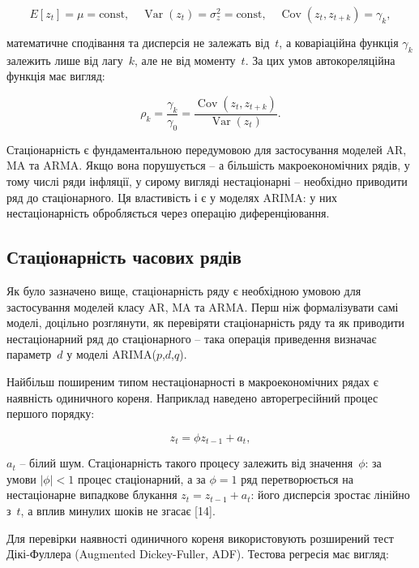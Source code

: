 \documentclass{bachelor_thesis}
\begin{document}
\begin{equation*}
E[z_t] = \mu = \text{const}, \quad \operatorname{Var}(z_t) = \sigma_z^2 = \text{const}, \quad \operatorname{Cov}(z_t, z_{t+k}) = \gamma_k,
\end{equation*}

 математичне сподівання та дисперсія не залежать від~$t$, а коваріаційна функція $\gamma_k$ залежить лише від лагу~$k$, але не від моменту~$t$. За цих умов автокореляційна функція має вигляд:

\begin{equation}\label{eq:acf}
\rho_k = \frac{\gamma_k}{\gamma_0} = \frac{\operatorname{Cov}(z_t, z_{t+k})}{\operatorname{Var}(z_t)}.
\end{equation}

Стаціонарність є фундаментальною передумовою для застосування моделей AR, MA та ARMA. Якщо вона порушується -- а більшість макроекономічних рядів, у тому числі ряди інфляції, у сирому вигляді нестаціонарні -- необхідно приводити ряд до стаціонарного. Ця властивість і є у моделях ARIMA: у них нестаціонарність обробляється через операцію диференціювання.

\subsection{Стаціонарність часових рядів}

Як було зазначено вище, стаціонарність ряду є необхідною умовою для застосування моделей класу AR, MA та ARMA. Перш ніж формалізувати самі моделі, доцільно розглянути, як перевіряти стаціонарність ряду та як приводити нестаціонарний ряд до стаціонарного -- така операція приведення визначає параметр~$d$ у моделі ARIMA($p$,$d$,$q$).

Найбільш поширеним типом нестаціонарності в макроекономічних рядах є наявність одиничного кореня. Наприклад наведено авторегресійний процес першого порядку:

\begin{equation*}
z_t = \phi z_{t-1} + a_t,
\end{equation*}

 $a_t$ -- білий шум. Стаціонарність такого процесу залежить від значення~$\phi$: за умови $|\phi| < 1$ процес стаціонарний, а за $\phi = 1$ ряд перетворюється на нестаціонарне випадкове блукання $z_t = z_{t-1} + a_t$: його дисперсія зростає лінійно з~$t$, а вплив минулих шоків не згасає [14].

Для перевірки наявності одиничного кореня використовують розширений тест Дікі-Фуллера (Augmented Dickey-Fuller, ADF). Тестова регресія має вигляд:
\end{document}
